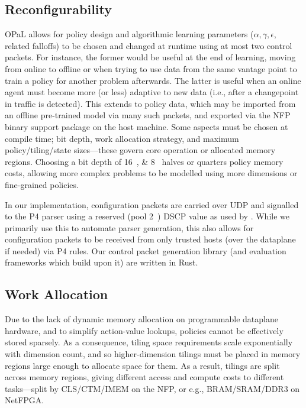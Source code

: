 \documentclass[
sigconf,natbib=false
]{acmart}
\newcommand{\approachshort}{OPaL}
\begin{document}
\subsection{Reconfigurability}
\approachshort{} allows for policy design and algorithmic learning parameters ($\alpha, \gamma, \epsilon$, related falloffs) to be chosen and changed at runtime using at most two control packets.
For instance, the former would be useful at the end of learning, moving from online to offline or when trying to use data from the same vantage point to train a policy for another problem afterwards.
The latter is useful when an online agent must become more (or less) adaptive to new data (i.e., after a changepoint in traffic is detected).
This extends to policy data, which may be imported from an offline pre-trained model via many such packets, and exported via the NFP binary support package on the host machine.
Some aspects must be chosen at compile time; bit depth, work allocation strategy, and maximum policy/tiling/state sizes---these govern core operation or allocated memory regions.
Choosing a bit depth of \qtylist[list-pair-separator = { or }]{16;8}{\bit} halves or quarters policy memory costs, allowing more complex problems to be modelled using more dimensions or fine-grained policies.

In our implementation, configuration packets are carried over UDP and signalled to the P4 parser using a reserved (pool 2~\parencite{rfc2474}) DSCP value as used by \textcite{DBLP:conf/isca/LiLYCSH19}.
While we primarily use this to automate parser generation, this also allows for configuration packets to be received from only trusted hosts (over the dataplane if needed) via P4 rules.
Our control packet generation library (and evaluation frameworks which build upon it) are written in Rust.


\subsection{Work Allocation}\label{sec:work-allocation}
Due to the lack of dynamic memory allocation on programmable dataplane hardware, and to simplify action-value lookups, policies cannot be effectively stored sparsely.
As a consequence, tiling space requirements scale exponentially with dimension count, and so higher-dimension tilings must be placed in memory regions large enough to allocate space for them.
As a result, tilings are split across memory regions, giving different access and compute costs to different tasks---split by CLS/CTM/IMEM on the NFP, or e.g., BRAM/SRAM/DDR3 on NetFPGA.
\end{document}
